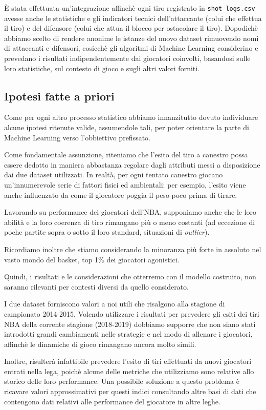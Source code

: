 
È stata effettuata un’integrazione affinchè ogni tiro registrato in \texttt{shot\_logs.csv} avesse anche le statistiche e gli indicatori tecnici dell’attaccante (colui che effettua il tiro) e del difensore (colui che attua il blocco per ostacolare il tiro). Dopodichè abbiamo scelto di rendere anonime le istanze del nuovo dataset rimuovendo nomi di attaccanti e difensori, cosicchè gli algoritmi di Machine Learning considerino e prevedano i risultati indipendentemente dai giocatori coinvolti, basandosi sulle loro statistiche, sul contesto di gioco e sugli altri valori forniti.

\subsection{Ipotesi fatte a priori}

Come per ogni altro processo statistico abbiamo innanzitutto dovuto individuare alcune ipotesi ritenute valide, assumendole tali, per poter orientare la parte di Machine Learning verso l’obbiettivo prefissato.
\par
Come fondamentale assunzione, riteniamo che l’esito del tiro a canestro possa essere dedotto in maniera abbastanza regolare dagli  attributi messi a disposizione dai due dataset utilizzati. In realtà, per ogni tentato canestro giocano un’innumerevole serie di fattori fisici ed ambientali: per esempio, l’esito viene anche influenzato da come il giocatore poggia il peso poco prima di tirare.
\par
Lavorando su performance dei giocatori dell’NBA, supponiamo anche che le loro abilità e la loro coerenza di tiro rimangano più o meno costanti (ad eccezione di poche partite sopra o sotto il loro standard, situazioni di \textit{outlier}).
\par
Ricordiamo inoltre che stiamo considerando la minoranza più forte in assoluto nel vasto mondo del basket, top 1\% dei giocatori agonistici. 
\par
\par
Quindi, i risultati e le considerazioni che otterremo con il modello costruito, non saranno rilevanti per contesti diversi da quello considerato.
\par
I due dataset forniscono valori a noi utili che risalgono alla stagione di campionato 2014-2015. Volendo utilizzare i risultati per prevedere gli esiti dei tiri NBA della corrente stagione (2018-2019) dobbiamo supporre che non siano stati introdotti grandi cambiamenti nelle strategie e nel modo di allenare i giocatori, affinchè le dinamiche di gioco rimangano ancora molto simili.
\par
Inoltre, risulterà infattibile prevedere l’esito di tiri effettuati da nuovi giocatori entrati nella lega, poichè alcune delle metriche che utilizziamo sono relative allo storico delle loro performance. 
Una possibile soluzione a questo problema è ricavare valori approssimativi per questi indici consultando altre basi di dati che contengono dati relativi alle performance del giocatore in altre leghe.

